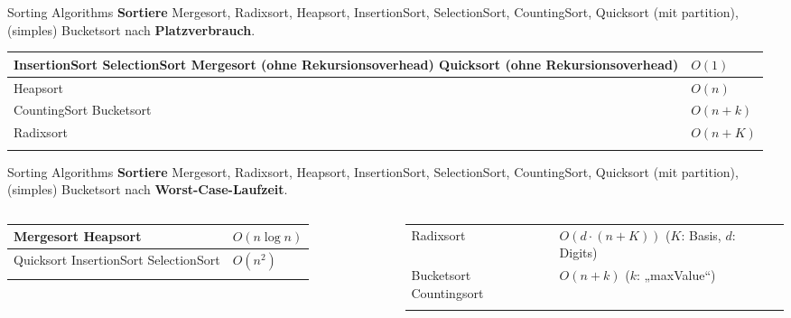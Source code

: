 \begin{frame}{Sorting Algorithms}
	\textbf{Sortiere} Mergesort, Radixsort, Heapsort, InsertionSort, SelectionSort, CountingSort, Quicksort {\small (mit partition)}, (simples) Bucketsort nach \textbf{Platzverbrauch}. \\ \pause
	\forcenewline
	\centering
	\begin{tabular}{m{.55\linewidth} | m{.15\linewidth} }
		\hhline{=|=}
		InsertionSort \newline 
		SelectionSort \newline
		Mergesort (ohne Rekursionsoverhead) \newline
		Quicksort (ohne Rekursionsoverhead) & $O(1)$ \\
		\hline
		Heapsort & $O(n)$ \\
		\hhline{=|=}
		CountingSort \newline 
		Bucketsort & $O(n+k)$ \\
		\hhline{=|=}
		Radixsort & $O(n+K)$ \\
		\hhline{=|=}
	\end{tabular}
\end{frame}

\begin{frame}{Sorting Algorithms}
	\textbf{Sortiere} Mergesort, Radixsort, Heapsort, InsertionSort, SelectionSort, CountingSort, Quicksort {\small (mit partition)}, (simples) Bucketsort nach \textbf{Worst-Case-Laufzeit}. \\ \pause
	\forcenewline
	\begin{columns}
		\begin{tabular}{m{.4\linewidth} | m{.3\linewidth} }
			\hhline{=|=}
			Mergesort \newline
			Heapsort & $O(n \log n)$ \\
			\hline
			Quicksort \newline 
			InsertionSort \newline 
			SelectionSort & $O(n^2)$ \\
			\hhline{=|=}
		\end{tabular}
		\hspace{-2\baselineskip}
		\begin{tabular}{m{.37\linewidth} | m{.47\linewidth} }
			\hhline{=|=}
			Radixsort & $O(d \cdot (n + K))$ \newline ($K$: Basis, \newline $d$: Digits)\\
			\hhline{=|=}
			Bucketsort \newline
			Countingsort & $O(n+k)$ \newline ($k$: „maxValue“) \\
			\hhline{=|=}
		\end{tabular}
	\end{columns}
\end{frame}

